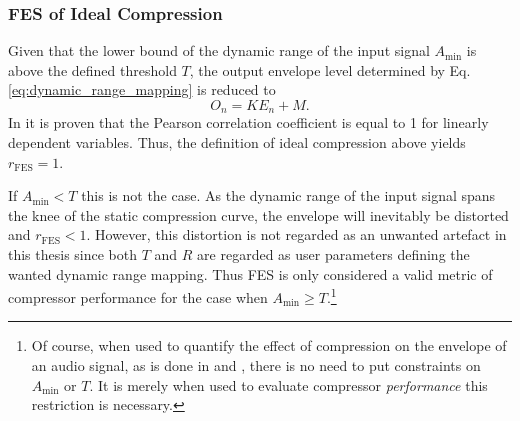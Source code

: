 \documentclass[../main2.tex]{subfiles}
\begin{document}
\subsubsection{FES of Ideal Compression}
Given that the lower bound of the dynamic range of the input signal $A_\text{min}$ is above the defined threshold $T$, the output envelope level determined by Eq.\eqref{eq:dynamic_range_mapping} is reduced to
\begin{equation}
O_n = K E_n + M.
\end{equation}
In \cite{XXXX} it is proven that the Pearson correlation coefficient is equal to 1 for linearly dependent variables. Thus, the definition of ideal compression above yields $r_\text{FES} = 1$.

If $A_\text{min} < T$ this is not the case. As the dynamic range of the input signal spans the knee of the static compression curve, the envelope will inevitably be distorted and $r_\text{FES} < 1$. However, this distortion is not regarded as an unwanted artefact in this thesis since both $T$ and $R$ are regarded as user parameters defining the wanted dynamic range mapping. Thus FES is only considered a valid metric of compressor performance for the case when $A_\text{min} \geq T$.\footnote{Of course, when used to quantify the effect of compression on the envelope of an audio signal, as is done in \cite{XXXX} and \cite{XXXX}, there is no need to put constraints on $A_\text{min}$ or $T$. It is merely when used to evaluate compressor \emph{performance} this restriction is necessary.}

\end{document}
